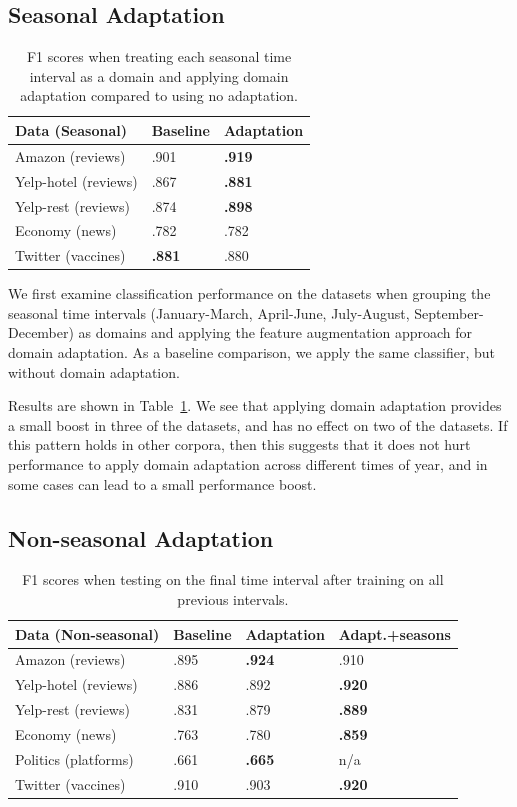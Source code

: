 \subsection{Seasonal Adaptation}

\begin{table}[htp]
\centering
\begin{tabular}{|l|l|l|}
\hline
\bf Data (Seasonal) & \bf Baseline & \bf Adaptation \\
\hline
Amazon (reviews) & .901 & \bf .919 \\
Yelp-hotel (reviews) & .867 & \bf .881 \\
Yelp-rest (reviews) & .874 & \bf .898  \\
Economy (news) & .782 & .782  \\
Twitter (vaccines) & \bf .881 & .880  \\
\hline
\end{tabular}
\caption{\label{chap3:tab:results_seasonal} F1 scores when treating each seasonal time interval as a domain and applying domain adaptation compared to using no adaptation.}
\end{table}

We first examine classification performance on the datasets when grouping the seasonal time intervals (January-March, April-June, July-August, September-December) as domains and applying the feature augmentation approach for domain adaptation. 
As a baseline comparison, we apply the same classifier, but without domain adaptation.

Results are shown in Table~\ref{chap3:tab:results_seasonal}.
We see that applying domain adaptation provides a small boost in three of the datasets, and has no effect on two of the datasets.
If this pattern holds in other corpora, then this suggests that it does not hurt performance to apply domain adaptation across different times of year, and in some cases can lead to a small performance boost.

\subsection{Non-seasonal Adaptation}
\label{subsec:nonseasonal}

\begin{table}[htp]
\centering
\begin{tabular}{|l|l|l|l|}
\hline
\bf Data (Non-seasonal) & \bf Baseline & \bf Adaptation & \bf Adapt.+seasons \\
\hline
Amazon (reviews) & .895 & \bf .924 & .910 \\
Yelp-hotel (reviews) & .886 & .892 & \bf .920 \\
Yelp-rest (reviews) & .831 & .879 & \bf .889   \\
Economy (news) & .763 & .780 & \bf .859 \\
Politics (platforms) & .661 & \bf .665 & n/a \\
Twitter (vaccines) & .910 & .903 & \bf .920 \\
\hline
\end{tabular}
\caption{\label{chap3:tab:results_nonseasonal_future} F1 scores when testing on the final time interval after training on all previous intervals.}
\end{table}


